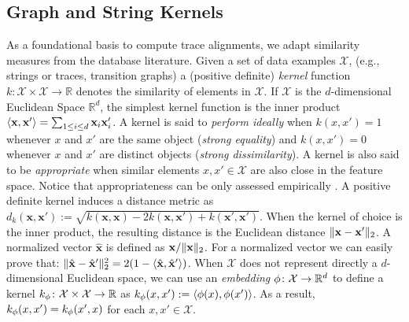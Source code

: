 

\subsection{Graph and String Kernels}\label{subsec:katk}
 As a foundational basis to compute trace alignments, we adapt similarity measures from the database literature.  Given a set of data examples $\mathcal{X}$, (e.g., strings or traces, transition graphs) a (positive definite) \emph{kernel} function $k\colon \mathcal{X}\times \mathcal{X}\to \mathbb{R}$ denotes the similarity of elements in $\mathcal{X}$. If $\mathcal{X}$ is the $d$-dimensional Euclidean Space $\mathbb{R}^d$, the simplest kernel function is the inner product $\Braket{\mathbf{x},\mathbf{x}'}=\sum_{1\leq i\leq d}\mathbf{x}_i\mathbf{x}'_i$.
A kernel is said to \emph{perform ideally} \cite{Gartner03} when $k(x,x')=1$ whenever $x$ and $x'$ are the same object (\textit{strong equality}) and $k(x,x')=0$ whenever $x$ and $x'$ are distinct objects (\textit{strong dissimilarity}). A kernel is also said to be \emph{appropriate} when similar elements $x,x'\in\mathcal{X}$ are also close in the feature space. Notice that appropriateness can be only assessed  empirically \cite{Gartner03}.
A positive definite kernel induces a distance metric as
$
d_k(\mathbf{x},\mathbf{x}'):=\sqrt{k(\mathbf{x},\mathbf{x})-2k(\mathbf{x},\mathbf{x}')+k(\mathbf{x}',\mathbf{x}')}
$.
When the kernel of choice is the inner product, the resulting distance is the Euclidean distance $\|\mathbf{x}-\mathbf{x}'\|_{2}$. A normalized vector $\hat{\mathbf{x}}$ is defined as $\mathbf{x}/\|\mathbf{x}\|_{2}$. For a normalized vector we can easily prove that: $\|\hat{\mathbf{x}}-\hat{\mathbf{x}}'\|_{2}^2=2(1-\Braket{\hat{\mathbf{x}},\hat{\mathbf{x}}'})$.
When $\mathcal{X}$ does not represent directly a $d$-dimensional Euclidean space, we can use an \emph{embedding} $\phi\colon\mathcal{X}\to \mathbb{R}^d$ to define a kernel $k_\phi\colon \mathcal{X}\times \mathcal{X}\to\mathbb{R}$ as $k_\phi(x,x'):=\Braket{\phi(x),\phi(x')}$. As a result, $k_\phi(x,x')=k_\phi(x',x)$ for each $x,x'\in\mathcal{X}$.



